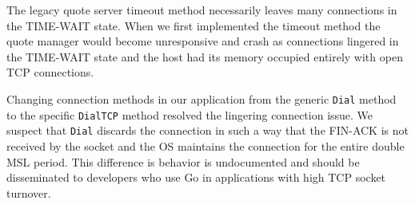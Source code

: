 The legacy quote server timeout method necessarily leaves many connections in the TIME-WAIT state.
When we first implemented the timeout method the quote manager would become unresponsive and crash as connections lingered in the TIME-WAIT state and the host had its memory occupied entirely with open TCP connections.

Changing connection methods in our application from the generic \texttt{Dial} method to the specific \texttt{DialTCP} method resolved the lingering connection issue.
We suspect that \texttt{Dial} discards the connection in such a way that the FIN-ACK is not received by the socket and the OS maintains the connection for the entire double MSL period.
This difference is behavior is undocumented and should be disseminated to developers who use Go in applications with high TCP socket turnover.
